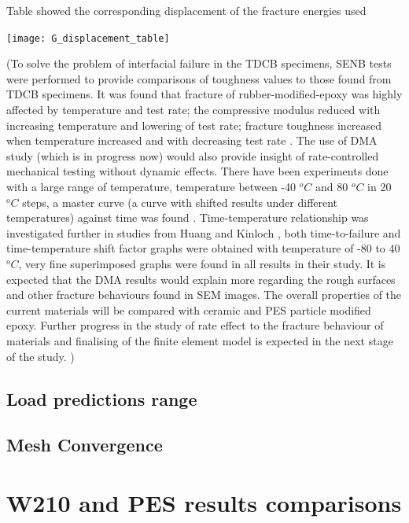 \documentclass[numbers=noendperiod,chapterprefix=on]{icldt} %
\begin{document}
   \begin{table}
      \centering
      \caption{Table showed the corresponding displacement of the fracture energies used}\label{G_displacement_table}
      \texttt{[image: G\_displacement\_table]}
      \end{table}     
      \FloatBarrier     


          
(To solve the problem of interfacial failure in the TDCB specimens, SENB tests were performed to provide comparisons of toughness values to those found from TDCB specimens.  
It was found that fracture of rubber-modified-epoxy was highly affected by temperature and test rate; the compressive modulus reduced with increasing temperature and lowering of test rate; fracture toughness increased when temperature increased and with decreasing test rate \cite{Brett2011}. 
The use of DMA study (which is in progress now) would also provide insight of rate-controlled mechanical testing without dynamic effects. There have been experiments done with a large range of temperature, temperature between -40 $^oC$ and 80 $^oC$ in 20 $^oC$ steps, a master curve (a curve with shifted results under different temperatures) against time was found \cite{Brett2011}. Time-temperature relationship was investigated further in studies from Huang and Kinloch \cite{Meschut2013}, both time-to-failure and time-temperature shift factor graphs were obtained with temperature of -80 to 40 $^oC$, very fine superimposed graphs were found in all results in their study. It is expected that the DMA results would explain more regarding the rough surfaces and other fracture behaviours found in SEM images.
The overall properties of the current materials will be compared with ceramic and PES particle modified epoxy. Further progress in the study of rate effect to the fracture behaviour of materials and finalising of the finite element model is expected in the next stage of the study. )

\section{Load predictions range}



\section{Mesh Convergence}



\chapter{W210 and PES results comparisons} \label{W210_PES}
\end{document}
